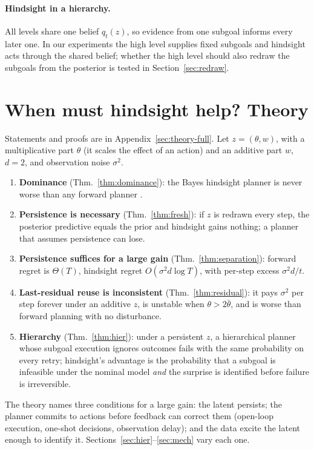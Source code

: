 \documentclass[11pt]{article}
\begin{document}
\paragraph{Hindsight in a hierarchy.} All levels share one belief $q_t(z)$, so evidence from one subgoal informs
every later one. In our experiments the high level supplies fixed subgoals and hindsight acts through the shared
belief; whether the high level should also redraw the subgoals from the posterior is tested in Section~\ref{sec:redraw}.

\section{When must hindsight help? Theory}
\label{sec:theory}

Statements and proofs are in Appendix~\ref{sec:theory-full}. Let $z=(\theta,w)$, with a multiplicative part $\theta$
(it scales the effect of an action) and an additive part $w$, $d=2$, and observation noise $\sigma^2$.
\begin{enumerate}
\item \textbf{Dominance} (Thm.~\ref{thm:dominance}): the Bayes hindsight planner is never worse than any forward
planner \citep{blackwell1953}.
\item \textbf{Persistence is necessary} (Thm.~\ref{thm:fresh}): if $z$ is redrawn every step, the posterior predictive
equals the prior and hindsight gains nothing; a planner that assumes persistence can lose.
\item \textbf{Persistence suffices for a large gain} (Thm.~\ref{thm:separation}): forward regret is $\Theta(T)$,
hindsight regret $O(\sigma^2d\log T)$, with per-step excess $\sigma^2d/t$.
\item \textbf{Last-residual reuse is inconsistent} (Thm.~\ref{thm:residual}): it pays $\sigma^2$ per step forever under
an additive $z$, is unstable when $\theta>2\bar\theta$, and is worse than forward planning with no disturbance.
\item \textbf{Hierarchy} (Thm.~\ref{thm:hier}): under a persistent $z$, a hierarchical planner whose subgoal execution
ignores outcomes fails with the same probability on every retry; hindsight's advantage is the probability that a
subgoal is infeasible under the nominal model \emph{and} the surprise is identified before failure is irreversible.
\end{enumerate}
The theory names three conditions for a large gain: the latent persists; the planner commits to actions before
feedback can correct them (open-loop execution, one-shot decisions, observation delay); and the data excite the
latent enough to identify it. Sections~\ref{sec:hier}--\ref{sec:mech} vary each one.
\end{document}
